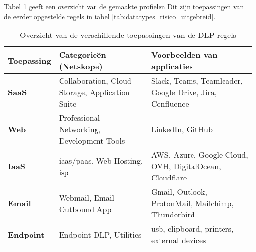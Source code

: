 



\section{}
\label{subsubsec:toepassingen}

Tabel \ref{tab:toepassingen} geeft een overzicht van de gemaakte profielen 
Dit zijn toepassingen van de eerder opgestelde regels in tabel \ref{tab:datatypes_risico_uitgebreid}.

\begin{table}[h]
    \centering
    \small
    \scriptsize
    \begin{tabular}{p{3cm}p{5cm}p{6cm}}
        \toprule
        \textbf{Toepassing} & \textbf{Categorieën (Netskope)} & \textbf{Voorbeelden van applicaties} \\
        \midrule
        \textbf{SaaS}     & Collaboration, Cloud Storage, Application Suite & Slack, Teams, Teamleader, Google Drive, Jira, Confluence \\
        \textbf{Web}      & Professional Networking, Development Tools & LinkedIn, GitHub \\
        \textbf{IaaS}     & \gls{iaas}/\gls{paas}, Web Hosting, \gls{isp} & AWS, Azure, Google Cloud, OVH, DigitalOcean, Cloudflare \\
        \textbf{Email}    & Webmail, Email Outbound App & Gmail, Outlook, ProtonMail, Mailchimp, Thunderbird \\
        \textbf{Endpoint} & Endpoint DLP, Utilities & \gls{usb}, clipboard, printers, external devices \\
        \bottomrule
    \end{tabular}
    \caption{Overzicht van de verschillende toepassingen van de DLP-regels}
    \label{tab:toepassingen}
\end{table}

